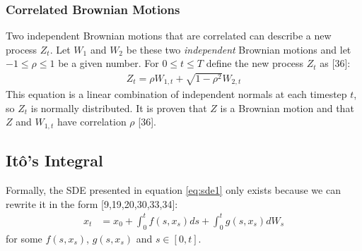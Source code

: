 \documentclass[12pt,twoside]{reedthesis}
\theoremstyle{definition}
\theoremstyle{definition}
\theoremstyle{remark}
\begin{document}
  \subsubsection{Correlated Brownian Motions}\label{corr}
  
  Two independent Brownian motions that are correlated can describe a new
  process \(Z_t\). Let \(W_1\) and \(W_2\) be these two \emph{independent}
  Brownian motions and let \(-1 \leq \rho \leq 1\) be a given number. For
  \(0 \leq t \leq T\) define the new process \(Z_t\) as {[}36{]}:
  \begin{align}
  \label{eq:corr_brow}
  Z_t = \rho W_{1,t} + \sqrt{1-\rho^2}W_{2,t}
  \end{align}
  \noindent
  This equation is a linear combination of independent normals at each
  timestep \(t\), so \(Z_t\) is normally distributed. It is proven that
  \(Z\) is a Brownian motion and that \(Z\) and \(W_{1,t}\) have
  correlation \(\rho\) {[}36{]}.
  
  \subsection{Itô's Integral}\label{itos-integral}
  
  Formally, the SDE presented in equation \eqref{eq:sde1} only exists
  because we can rewrite it in the form {[}9,19,20,30,33,34{]}:
  \begin{align} 
  \label{eq:sde2}
  x_t &= x_0 + \int_{0}^{t}{f(s, x_s)ds} + \int_{0}^{t}{g(s, x_s)dW_s}
  \end{align}
  \noindent
  for some \(f(s, x_s)\), \(g(s, x_s)\) and \(s \in [0,t]\).
  
\end{document}
